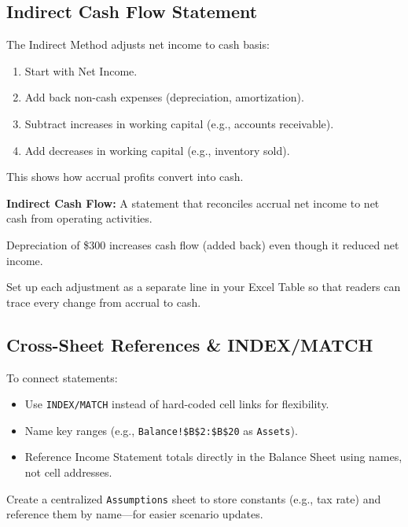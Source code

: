 \subsection{Indirect Cash Flow Statement}
The Indirect Method adjusts net income to cash basis:

\begin{enumerate}
  \item Start with Net Income.
  \item Add back non-cash expenses (depreciation, amortization).
  \item Subtract increases in working capital (e.g., accounts receivable).
  \item Add decreases in working capital (e.g., inventory sold).
\end{enumerate}

This shows how accrual profits convert into cash.

\begin{Definition}
\textbf{Indirect Cash Flow:} A statement that reconciles accrual net income to net cash from operating activities.
\end{Definition}

\begin{Example}
Depreciation of \$300 increases cash flow (added back) even though it reduced net income.
\end{Example}

\begin{Tip}
Set up each adjustment as a separate line in your Excel Table so that readers can trace every change from accrual to cash.
\end{Tip}

\subsection{Cross-Sheet References \& INDEX/MATCH}
To connect statements:

\begin{itemize}
  \item Use \verb|INDEX/MATCH| instead of hard-coded cell links for flexibility.
  \item Name key ranges (e.g., \verb|Balance!$B$2:$B$20| as \verb|Assets|).
  \item Reference Income Statement totals directly in the Balance Sheet using names, not cell addresses.
\end{itemize}

\begin{Tip}
Create a centralized \verb|Assumptions| sheet to store constants (e.g., tax rate) and reference them by name—for easier scenario updates.
\end{Tip}

